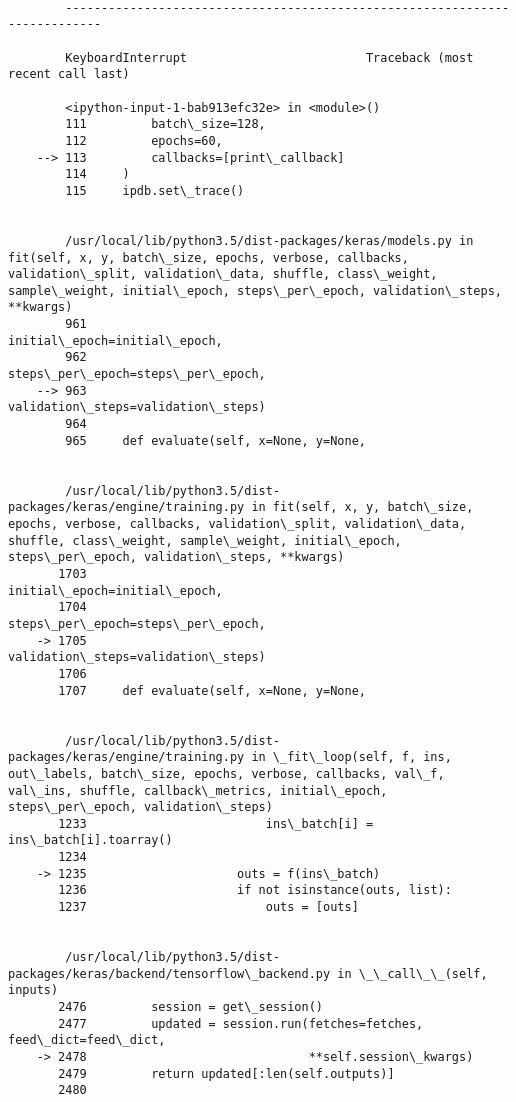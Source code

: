 \documentclass[11pt]{article}
\begin{document}
    \begin{Verbatim}[commandchars=\\\{\}]

        ---------------------------------------------------------------------------

        KeyboardInterrupt                         Traceback (most recent call last)

        <ipython-input-1-bab913efc32e> in <module>()
        111         batch\_size=128,
        112         epochs=60,
    --> 113         callbacks=[print\_callback]
        114     )
        115     ipdb.set\_trace()


        /usr/local/lib/python3.5/dist-packages/keras/models.py in fit(self, x, y, batch\_size, epochs, verbose, callbacks, validation\_split, validation\_data, shuffle, class\_weight, sample\_weight, initial\_epoch, steps\_per\_epoch, validation\_steps, **kwargs)
        961                               initial\_epoch=initial\_epoch,
        962                               steps\_per\_epoch=steps\_per\_epoch,
    --> 963                               validation\_steps=validation\_steps)
        964 
        965     def evaluate(self, x=None, y=None,


        /usr/local/lib/python3.5/dist-packages/keras/engine/training.py in fit(self, x, y, batch\_size, epochs, verbose, callbacks, validation\_split, validation\_data, shuffle, class\_weight, sample\_weight, initial\_epoch, steps\_per\_epoch, validation\_steps, **kwargs)
       1703                               initial\_epoch=initial\_epoch,
       1704                               steps\_per\_epoch=steps\_per\_epoch,
    -> 1705                               validation\_steps=validation\_steps)
       1706 
       1707     def evaluate(self, x=None, y=None,


        /usr/local/lib/python3.5/dist-packages/keras/engine/training.py in \_fit\_loop(self, f, ins, out\_labels, batch\_size, epochs, verbose, callbacks, val\_f, val\_ins, shuffle, callback\_metrics, initial\_epoch, steps\_per\_epoch, validation\_steps)
       1233                         ins\_batch[i] = ins\_batch[i].toarray()
       1234 
    -> 1235                     outs = f(ins\_batch)
       1236                     if not isinstance(outs, list):
       1237                         outs = [outs]


        /usr/local/lib/python3.5/dist-packages/keras/backend/tensorflow\_backend.py in \_\_call\_\_(self, inputs)
       2476         session = get\_session()
       2477         updated = session.run(fetches=fetches, feed\_dict=feed\_dict,
    -> 2478                               **self.session\_kwargs)
       2479         return updated[:len(self.outputs)]
       2480 



\end{Verbatim}
\end{document}

